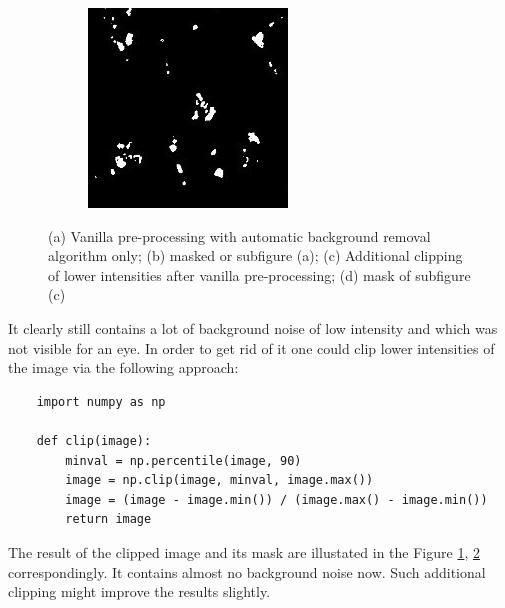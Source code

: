 \begin{figure}[htb]
\begin{subfigure}[b]{0.22\textwidth}
		\caption{}
		\label{subfig:clipping}
	\end{subfigure}
	\hfill
	\begin{subfigure}[b]{0.22\textwidth}
		\centering
		\includegraphics[width=\textwidth]{bilder/preprocessing/crop_golgi_full_processed_mask.png}
		\caption{}
		\label{subfig:clipping-mask}
	\end{subfigure}
	   \caption{(a) Vanilla pre-processing with automatic background removal algorithm only; (b) masked or subfigure (a); (c) Additional clipping of lower intensities after vanilla pre-processing; (d) mask of subfigure (c)}
	   \label{fig:pre-processing-golgi}
\end{figure}
It clearly still contains a lot of background noise of low intensity and which was not visible for an eye. In order to get rid of it one could clip lower intensities of the image via the following approach:
\begin{lstlisting}
	import numpy as np

	def clip(image):
		minval = np.percentile(image, 90)
		image = np.clip(image, minval, image.max())
		image = (image - image.min()) / (image.max() - image.min())
		return image
\end{lstlisting}

The result of the clipped image and its mask are illustated in the Figure \ref{subfig:clipping}, \ref{subfig:clipping-mask} correspondingly. It contains almost no background noise now. Such additional clipping might improve the results slightly.
